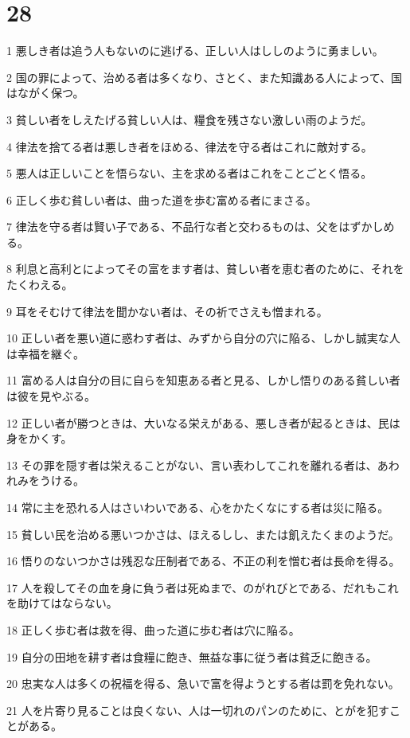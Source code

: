 \chapter{28}

\par 1 悪しき者は追う人もないのに逃げる、正しい人はししのように勇ましい。
\par 2 国の罪によって、治める者は多くなり、さとく、また知識ある人によって、国はながく保つ。
\par 3 貧しい者をしえたげる貧しい人は、糧食を残さない激しい雨のようだ。
\par 4 律法を捨てる者は悪しき者をほめる、律法を守る者はこれに敵対する。
\par 5 悪人は正しいことを悟らない、主を求める者はこれをことごとく悟る。
\par 6 正しく歩む貧しい者は、曲った道を歩む富める者にまさる。
\par 7 律法を守る者は賢い子である、不品行な者と交わるものは、父をはずかしめる。
\par 8 利息と高利とによってその富をます者は、貧しい者を恵む者のために、それをたくわえる。
\par 9 耳をそむけて律法を聞かない者は、その祈でさえも憎まれる。
\par 10 正しい者を悪い道に惑わす者は、みずから自分の穴に陥る、しかし誠実な人は幸福を継ぐ。
\par 11 富める人は自分の目に自らを知恵ある者と見る、しかし悟りのある貧しい者は彼を見やぶる。
\par 12 正しい者が勝つときは、大いなる栄えがある、悪しき者が起るときは、民は身をかくす。
\par 13 その罪を隠す者は栄えることがない、言い表わしてこれを離れる者は、あわれみをうける。
\par 14 常に主を恐れる人はさいわいである、心をかたくなにする者は災に陥る。
\par 15 貧しい民を治める悪いつかさは、ほえるしし、または飢えたくまのようだ。
\par 16 悟りのないつかさは残忍な圧制者である、不正の利を憎む者は長命を得る。
\par 17 人を殺してその血を身に負う者は死ぬまで、のがれびとである、だれもこれを助けてはならない。
\par 18 正しく歩む者は救を得、曲った道に歩む者は穴に陥る。
\par 19 自分の田地を耕す者は食糧に飽き、無益な事に従う者は貧乏に飽きる。
\par 20 忠実な人は多くの祝福を得る、急いで富を得ようとする者は罰を免れない。
\par 21 人を片寄り見ることは良くない、人は一切れのパンのために、とがを犯すことがある。
